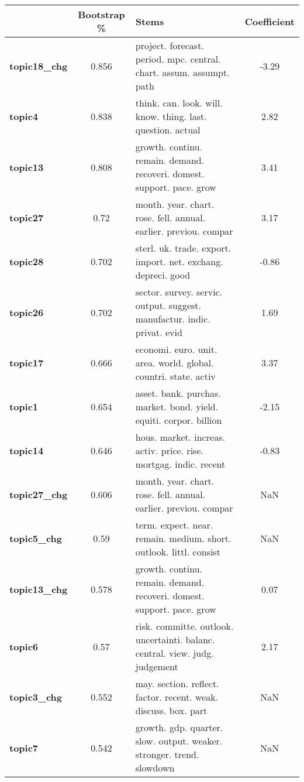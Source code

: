 \begin{tabular}{|l|c|l|c|}
\toprule
{} & Bootstrap \% &                                                                         Stems &  Coefficient \\
\midrule
\textbf{topic18\_chg} &  0.856 &  project. forecast. period. mpc. central. chart. assum. assumpt. path & -3.29 \\
\textbf{topic4     } &  0.838 &  think. can. look. will. know. thing. last. question. actual &  2.82 \\
\textbf{topic13    } &  0.808 &  growth. continu. remain. demand. recoveri. domest. support. pace. grow &  3.41 \\
\textbf{topic27    } &  0.72 &  month. year. chart. rose. fell. annual. earlier. previou. compar &  3.17 \\
\textbf{topic28    } &  0.702 &  sterl. uk. trade. export. import. net. exchang. depreci. good & -0.86 \\
\textbf{topic26    } &  0.702 &  sector. survey. servic. output. suggest. manufactur. indic. privat. evid &  1.69 \\
\textbf{topic17    } &  0.666 &  economi. euro. unit. area. world. global. countri. state. activ &  3.37 \\
\textbf{topic1     } &  0.654 &  asset. bank. purchas. market. bond. yield. equiti. corpor. billion & -2.15 \\
\textbf{topic14    } &  0.646 &  hous. market. increas. activ. price. rise. mortgag. indic. recent & -0.83 \\
\textbf{topic27\_chg} &  0.606 &  month. year. chart. rose. fell. annual. earlier. previou. compar & NaN \\
\textbf{topic5\_chg } &  0.59 &  term. expect. near. remain. medium. short. outlook. littl. consist & NaN \\
\textbf{topic13\_chg} &  0.578 &  growth. continu. remain. demand. recoveri. domest. support. pace. grow &  0.07 \\
\textbf{topic6     } &  0.57 &  risk. committe. outlook. uncertainti. balanc. central. view. judg. judgement &  2.17 \\
\textbf{topic3\_chg } &  0.552 &  may. section. reflect. factor. recent. weak. discuss. box. part & NaN \\
\textbf{topic7     } &  0.542 &  growth. gdp. quarter. slow. output. weaker. stronger. trend. slowdown & NaN \\
\bottomrule
\end{tabular}
